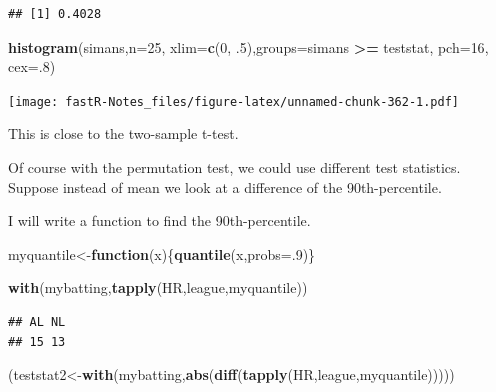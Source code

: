 \documentclass[]{book}
\newenvironment{Shaded}{\begin{snugshade}}{\end{snugshade}}
\newcommand{\KeywordTok}[1]{\textcolor[rgb]{0.13,0.29,0.53}{\textbf{#1}}}
\newcommand{\DataTypeTok}[1]{\textcolor[rgb]{0.13,0.29,0.53}{#1}}
\newcommand{\DecValTok}[1]{\textcolor[rgb]{0.00,0.00,0.81}{#1}}
\newcommand{\StringTok}[1]{\textcolor[rgb]{0.31,0.60,0.02}{#1}}
\newcommand{\ControlFlowTok}[1]{\textcolor[rgb]{0.13,0.29,0.53}{\textbf{#1}}}
\newcommand{\OperatorTok}[1]{\textcolor[rgb]{0.81,0.36,0.00}{\textbf{#1}}}
\newcommand{\NormalTok}[1]{#1}
\theoremstyle{definition}
\theoremstyle{definition}
\theoremstyle{definition}
\theoremstyle{remark}
\begin{document}
\begin{verbatim}
## [1] 0.4028
\end{verbatim}

\begin{Shaded}
\begin{Highlighting}[]
 \KeywordTok{histogram}\NormalTok{(simans,}\DataTypeTok{n=}\DecValTok{25}\NormalTok{, }\DataTypeTok{xlim=}\KeywordTok{c}\NormalTok{(}\DecValTok{0}\NormalTok{, .}\DecValTok{5}\NormalTok{),}\DataTypeTok{groups=}\NormalTok{simans }\OperatorTok{>=}\StringTok{ }\NormalTok{teststat, }\DataTypeTok{pch=}\DecValTok{16}\NormalTok{, }\DataTypeTok{cex=}\NormalTok{.}\DecValTok{8}\NormalTok{)}
\end{Highlighting}
\end{Shaded}

\texttt{[image: fastR-Notes\_files/figure-latex/unnamed-chunk-362-1.pdf]}

This is close to the two-sample t-test.

Of course with the permutation test, we could use different test
statistics. Suppose instead of mean we look at a difference of the
90th-percentile.

I will write a function to find the 90th-percentile.

\begin{Shaded}
\begin{Highlighting}[]
\NormalTok{myquantile<-}\ControlFlowTok{function}\NormalTok{(x)\{}\KeywordTok{quantile}\NormalTok{(x,}\DataTypeTok{probs=}\NormalTok{.}\DecValTok{9}\NormalTok{)\}}
\end{Highlighting}
\end{Shaded}

\begin{Shaded}
\begin{Highlighting}[]
\KeywordTok{with}\NormalTok{(mybatting,}\KeywordTok{tapply}\NormalTok{(HR,league,myquantile))}
\end{Highlighting}
\end{Shaded}

\begin{verbatim}
## AL NL 
## 15 13
\end{verbatim}

\begin{Shaded}
\begin{Highlighting}[]
\NormalTok{(teststat2<-}\KeywordTok{with}\NormalTok{(mybatting,}\KeywordTok{abs}\NormalTok{(}\KeywordTok{diff}\NormalTok{(}\KeywordTok{tapply}\NormalTok{(HR,league,myquantile)))))}
\end{Highlighting}
\end{Shaded}
\end{document}
